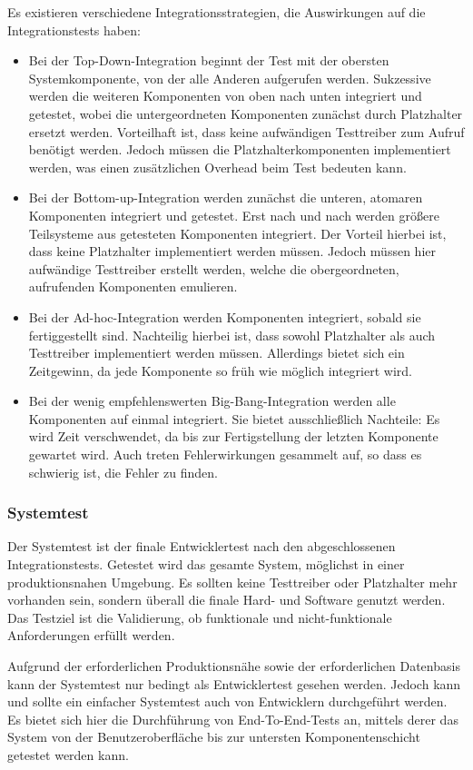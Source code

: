 Es existieren verschiedene Integrationsstrategien, die Auswirkungen auf die Integrationstests haben:\cite[][59\psq]{spillner}
\begin{itemize}
	\item Bei der Top-Down-Integration beginnt der Test mit der obersten Systemkomponente, von der alle Anderen aufgerufen werden. Sukzessive werden die weiteren Komponenten von oben nach unten integriert und getestet, wobei die untergeordneten Komponenten zunächst durch Platzhalter ersetzt werden. Vorteilhaft ist, dass keine aufwändigen Testtreiber zum Aufruf benötigt werden. Jedoch müssen die Platzhalterkomponenten implementiert werden, was einen zusätzlichen Overhead beim Test bedeuten kann.
	\item Bei der Bottom-up-Integration werden zunächst die unteren, atomaren Komponenten integriert und getestet. Erst nach und nach werden größere Teilsysteme aus getesteten Komponenten integriert. Der Vorteil hierbei ist, dass keine Platzhalter implementiert werden müssen. Jedoch müssen hier aufwändige Testtreiber erstellt werden, welche die obergeordneten, aufrufenden Komponenten emulieren.
	\item Bei der Ad-hoc-Integration werden Komponenten integriert, sobald sie fertiggestellt sind. Nachteilig hierbei ist, dass sowohl Platzhalter als auch Testtreiber implementiert werden müssen. Allerdings bietet sich ein Zeitgewinn, da jede Komponente so früh wie möglich integriert wird.
	\item Bei der wenig empfehlenswerten Big-Bang-Integration werden alle Komponenten auf einmal integriert. Sie bietet ausschließlich Nachteile: Es wird Zeit verschwendet, da bis zur Fertigstellung der letzten Komponente gewartet wird. Auch treten Fehlerwirkungen gesammelt auf, so dass es schwierig ist, die Fehler zu finden.
\end{itemize}

\subsubsection{Systemtest}
Der Systemtest ist der finale Entwicklertest nach den abgeschlossenen Integrationstests. Getestet wird das gesamte System, möglichst in einer produktionsnahen Umgebung. Es sollten keine Testtreiber oder Platzhalter mehr vorhanden sein, sondern überall die finale Hard- und Software genutzt werden. Das Testziel ist die Validierung, ob funktionale und nicht-funktionale Anforderungen erfüllt werden.\cite[][60\psqq]{spillner}

Aufgrund der erforderlichen Produktionsnähe sowie der erforderlichen Datenbasis kann der Systemtest nur bedingt als Entwicklertest gesehen werden\cites[236]{roitzsch}[]{oose}. Jedoch kann und sollte ein einfacher Systemtest auch von Entwicklern durchgeführt werden. Es bietet sich hier die Durchführung von End-To-End-Tests an, mittels derer das System von der Benutzeroberfläche bis zur untersten Komponentenschicht getestet werden kann\cite{softwaresanierung}.